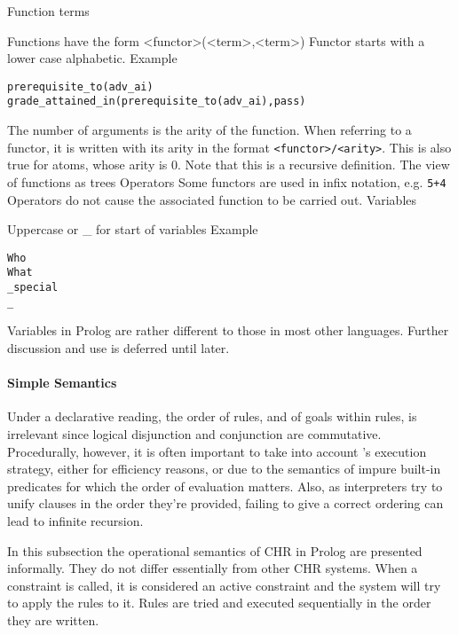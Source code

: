 \documentclass[thesis-solanki.tex]{subfiles}
\begin{document}
Function terms

Functions have the form <functor>(<term>{,<term>})
Functor starts with a lower case alphabetic.
Example
\par
\begin{verbatim}
prerequisite_to(adv_ai)
grade_attained_in(prerequisite_to(adv_ai),pass)
\end{verbatim}
     
The number of arguments is the arity of the function. When referring to a functor, it is written with its arity in
the format \Verb!<functor>/<arity>!. This is also true for atoms, whose arity is 0.
Note that this is a recursive definition.
The view of functions as trees
Operators
Some functors are used in infix notation, e.g. \Verb!5+4!
Operators do not cause the associated function to be carried out.
Variables

Uppercase or \_ for start of variables
Example
\par
\begin{verbatim}
Who
What
_special
_
\end{verbatim}
     
Variables in Prolog are rather different to those in most other languages. Further discussion and use is deferred until later.


\paragraph{Simple Semantics}

Under a declarative reading, the order of rules, and of goals within rules, is irrelevant since logical disjunction and conjunction are 
commutative.
Procedurally, however, it is often important to take into account 's execution strategy, either
for efficiency reasons, or due to the semantics of impure built-in predicates for which the order of evaluation
matters.
Also, as  interpreters try to unify clauses in the order they're provided, failing to give a
correct ordering can lead to infinite recursion.


In this subsection the operational semantics of CHR in Prolog are presented informally. They do not differ essentially from other CHR systems.
When a constraint is called, it is considered an active constraint and the system will try to apply the rules to it. Rules are tried and executed sequentially in the order they are written.

\cite{website:swiprologsyntaxandsemantics}
\end{document}
